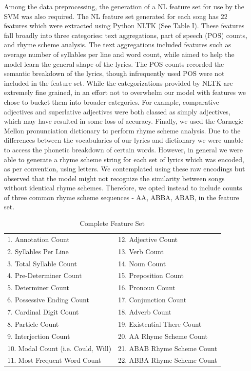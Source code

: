 \documentclass[journal]{IEEEtran}
\begin{document}
Among the data preprocessing, the generation of a NL feature set for use by the SVM was also required. The NL feature set generated for each song has 22 features which were extracted using Python NLTK (See Table I). These features fall broadly into three categories: text aggregations, part of speech (POS) counts, and rhyme scheme analysis. The text aggregations included features such as average number of syllables per line and word count, while aimed to help the model learn the general shape of the lyrics. The POS counts recorded the semantic breakdown of the lyrics, though infrequently used POS were not included in the feature set. While the categorizations provided by NLTK are extremely fine grained, in an effort not to overwhelm our model with features we chose to bucket them into broader categories. For example, comparative adjectives and superlative adjectives were both classed as simply adjectives, which may have resulted in some loss of accuracy. Finally, we used the Carnegie Mellon pronunciation dictionary to perform rhyme scheme analysis. Due to the differences between the vocabularies of our lyrics and dictionary we were unable to access the phonetic breakdown of certain words. However, in general we were able to generate a rhyme scheme string for each set of lyrics which was encoded, as per convention, using letters. We contemplated using these raw encodings but observed that the model might not recognize the similarity between songs without identical rhyme schemes. Therefore, we opted instead to include counts of three common rhyme scheme sequences - AA, ABBA, ABAB, in the feature set.

\begin{table}[h!]
    \label{tab:table1}
    \centering
    \caption{Complete Feature Set}
    \begin{tabular}{ll}
       & \\
      \hline
      
	1. Annotation Count & 12. Adjective Count \\
	2. Syllables Per Line & 13. Verb Count \\
	3. Total Syllable Count & 14. Noun Count \\
	4. Pre-Determiner Count& 15. Preposition Count \\
	5. Determiner Count & 16. Pronoun Count \\
	6. Possessive Ending Count & 17. Conjunction Count\\
	7. Cardinal Digit Count & 18. Adverb Count\\
	8. Particle Count & 19. Existential There Count \\
	9. Interjection Count & 20. AA Rhyme Scheme Count \\
	10. Modal Count (i.e. Could, Will)  & 21. ABAB Rhyme Scheme Count \\
	11. Most Frequent Word Count & 22. ABBA Rhyme Scheme Count
	
    \end{tabular}
\end{table}
\end{document}
